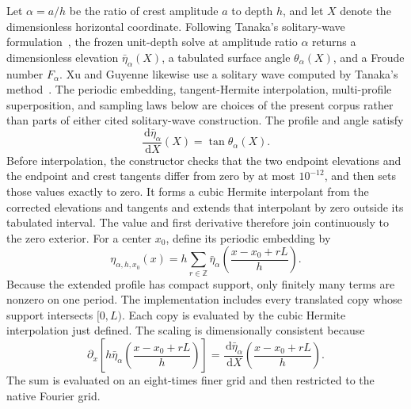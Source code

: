 \documentclass[11pt]{article}
\newcommand{\dd}{\,\mathrm d}
\begin{document}
Let $\alpha=a/h$ be the ratio of crest amplitude \(a\) to depth \(h\), and
let $X$ denote the dimensionless horizontal coordinate.  Following Tanaka's
solitary-wave formulation~\cite{tanaka1986}, the frozen unit-depth solve at
amplitude ratio \(\alpha\) returns a dimensionless elevation
$\bar\eta_\alpha(X)$, a tabulated surface angle
$\theta_\alpha(X)$, and a Froude number $F_\alpha$.  Xu and Guyenne likewise
use a solitary wave computed by Tanaka's method~\cite{xu2009}.  The periodic
embedding, tangent-Hermite interpolation, multi-profile superposition, and
sampling laws below are choices of the present corpus rather than parts of
either cited solitary-wave construction.  The profile and angle satisfy
\begin{equation}
  \frac{\dd\bar\eta_\alpha}{\dd X}(X)=\tan\theta_\alpha(X).
  \label{eq:tanaka-dimensionless-slope}
\end{equation}
Before interpolation, the constructor checks that the two endpoint
elevations and the endpoint and crest tangents differ from zero by at most
$10^{-12}$, and then sets those values exactly to zero.  It forms a cubic
Hermite interpolant from the corrected elevations and tangents and extends
that interpolant by zero outside its tabulated interval.  The value and first
derivative therefore join continuously to the zero exterior.  For a center
$x_0$, define its periodic embedding by
\begin{equation}
  \eta_{\alpha,h,x_0}(x)
  =h\sum_{r\in\mathbb Z}
    \bar\eta_\alpha\!\left(\frac{x-x_0+rL}{h}\right).
  \label{eq:tanaka-periodic-embedding}
\end{equation}
Because the extended profile has compact support, only finitely many terms
are nonzero on one period.  The implementation includes every translated
copy whose support intersects $[0,L)$.  Each copy is evaluated by the cubic
Hermite interpolation just defined.  The scaling is
dimensionally consistent because
\begin{equation}
  \partial_x\!\left[
    h\bar\eta_\alpha\!\left(\frac{x-x_0+rL}{h}\right)
  \right]
  =
  \frac{\dd\bar\eta_\alpha}{\dd X}
  \!\left(\frac{x-x_0+rL}{h}\right).
\end{equation}
The sum is evaluated on an eight-times finer grid and then restricted to the
native Fourier grid.
\end{document}
